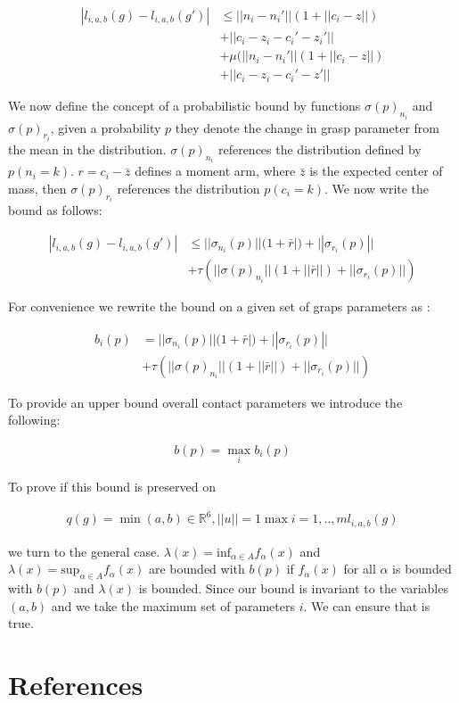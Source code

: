 \documentclass[letterpaper, 10 pt, conference]{ieeeconf}  %
\begin{document}
\begin{align*}
|l_{i,a,b}(g) - l_{i,a,b}(g')| &\leq ||n_i - n_i'||(1+||c_i - z||) \\
					&+ ||c_i - z_i - c_i'-z_i'|| \\
					&+ \mu(||n_i - n_i'||(1+||c_i - z||)\\
					&+||c_i - z_i-c_i'-z'||
\end{align*}

We now define the concept of a probabilistic bound by functions $\sigma(p)_{n_i}$ and $\sigma(p)_{r_i}$, given a probability $p$ they denote the change in grasp parameter from the mean in the distribution. $\sigma(p)_{n_i}$ references the distribution defined by $p(n_i = k)$. $r = c_i - \bar{z}$ defines a moment arm, where $\bar{z}$ is the expected center of mass, then $\sigma(p)_{r_i}$ references the distribution $p(c_i = k)$. We now write the bound as follows: 

 \begin{align*}
|l_{i,a,b}(g) - l_{i,a,b}(g')| &\leq ||\sigma_{n_i}(p)||(1+\bar{r}|) + ||\sigma_{r_i}(p)|| \\
                                      &+ \tau(||\sigma(p)_{n_i}||(1+||\bar{r}||)+||\sigma_{r_i}(p)||)
\end{align*}

For convenience we rewrite the bound on a given set of graps parameters as : 

 \begin{align*}
b_i(p) &= ||\sigma_{n_i}(p)||(1+\bar{r}|) + ||\sigma_{r_i}(p)|| \\
                                      &+ \tau(||\sigma(p)_{n_i}||(1+||\bar{r}||)+||\sigma_{r_i}(p)||)
\end{align*}

To provide an upper bound overall contact parameters we introduce the following: 

\begin{align}
b(p)  = \max_{i} b_i(p)
\end{align}

To prove if  this bound is preserved on

 \begin{align}
 q(g) = \min{(a,b) \in \mathbb{R}^6, ||u||=1} \max{i=1,..,m} l_{i,a,b}(g)
 \end{align}
 
we turn to the general case. $\lambda(x) = \mbox{inf}_{\alpha \in A} f_\alpha(x)$ and $\lambda(x) = \mbox{sup}_{\alpha \in A} f_\alpha(x)$ are bounded with $b(p)$ if $f_\alpha(x)$ for all $\alpha$ is bounded with $b(p)$ and $\lambda(x)$ is bounded. Since our bound is invariant to the variables $(a,b)$ and we take the maximum set of parameters $i$. We can ensure that is true.



\section{References}



\end{document}
